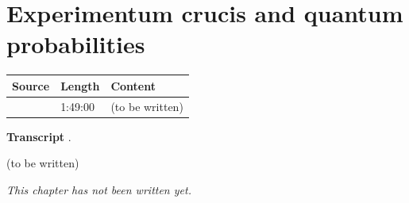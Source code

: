 \chapter{Experimentum crucis and quantum probabilities}\label{ch:c01}
\begin{paracol}{2}

\begin{sources}
\begin{tabularx}{\linewidth}{@{}l l L@{}}
\toprule
\textbf{Source} & \textbf{Length} & \textbf{Content}\\
\midrule
{} & 1:49:00 & (to be written)\\
\bottomrule
\end{tabularx}

\smallskip
\textbf{Transcript} .
\end{sources}

\begin{reading}
(to be written)
\end{reading}

\emph{This chapter has not been written yet.}

\flushside
\end{paracol}
